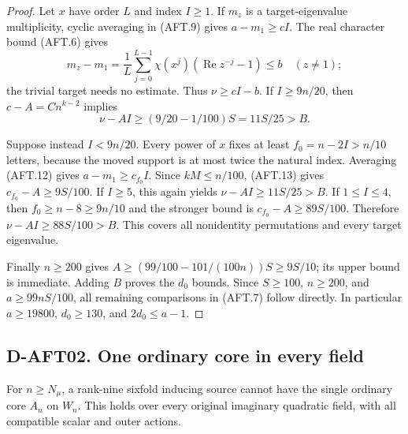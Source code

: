 \begin{proof}
Let $x$ have order $L$ and index $I\ge1$. If $m_z$ is a
target-eigenvalue multiplicity, cyclic averaging in (AFT.9)
gives $a-m_1\ge cI$. The real character bound (AFT.6) gives
\[
 m_z-m_1=\frac1L\sum_{j=0}^{L-1}\chi(x^j)
                    (\operatorname{Re}z^{-j}-1)\le b
 \quad(z\ne1);                                        \tag{AFT.14}
\]
the trivial target needs no estimate. Thus $\nu\ge cI-b$.
If $I\ge9n/20$, then $c-A=Cn^{k-2}$ implies
\[
                  \nu-AI\ge(9/20-1/100)S=11S/25>B.
                                                               \tag{AFT.15}
\]

Suppose instead $I<9n/20$. Every power of $x$ fixes at least
$f_0=n-2I>n/10$ letters, because the moved support is at most
twice the natural index. Averaging (AFT.12) gives
$a-m_1\ge c_{f_0}I$. Since $kM\le n/100$, (AFT.13)
gives $c_{f_0}-A\ge9S/100$. If $I\ge5$, this again yields
$\nu-AI\ge11S/25>B$. If $1\le I\le4$, then
$f_0\ge n-8\ge9n/10$ and the stronger bound is
$c_{f_0}-A\ge89S/100$. Therefore
$\nu-AI\ge88S/100>B$. This covers all nonidentity
permutations and every target eigenvalue.

Finally $n\ge200$ gives
$A\ge(99/100-101/(100n))S\ge9S/10$; its upper bound is
immediate. Adding $B$ proves the $d_0$ bounds. Since
$S\ge100$, $n\ge200$, and $a\ge99nS/100$, all remaining
comparisons in (AFT.7) follow directly. In particular
$a\ge19800$, $d_0\ge130$, and $2d_0\le a-1$.
\end{proof}

\subsection*{D-AFT02. One ordinary core in every field}

\begin{theorem}[D-AFT02]
For $n\ge N_\mu$, a rank-nine sixfold inducing source
cannot have the single ordinary core $A_n$ on $W_n$.
This holds over every original imaginary quadratic field,
with all compatible scalar and outer actions.
\end{theorem}

